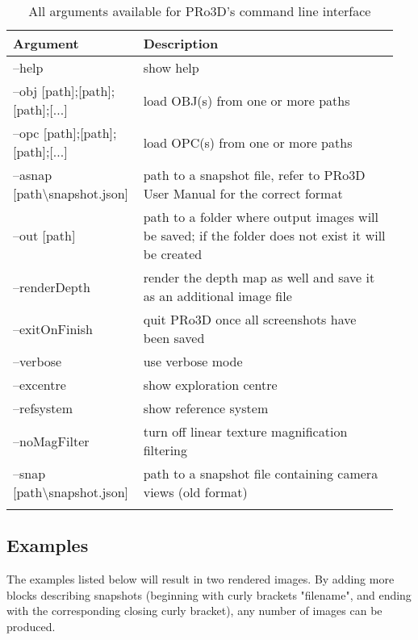  \begin{center}
 	\begin{table}
		\begin{tabular}{p{0.3\linewidth} p{0.65\linewidth} }
			\textbf{Argument}          		 & \textbf{Description} \\
			\midrule
			--help                            &  show help\\
			--obj [path];[path];[path];[...]  &  load OBJ(s) from one or more paths\\
			--opc [path];[path];[path];[...]  &  load OPC(s) from one or more paths\\
			--asnap [path\textbackslash snapshot.json]      &  path to a snapshot file, refer to PRo3D User Manual for the correct format\\
			--out [path]                      &  path to a folder where output images will be saved; if the folder does not exist it will be created\\
			--renderDepth         &              render the depth map as well and save it as an additional image file\\
			--exitOnFinish                    &  quit PRo3D once all screenshots have been saved\\
			--verbose                         &  use verbose mode\\
			--excentre                        &  show exploration centre\\
			--refsystem                       &  show reference system\\
			--noMagFilter                     &  turn off linear texture magnification filtering\\
			--snap [path\textbackslash snapshot.json]       &  path to a snapshot file containing camera views (old format)\\
			\specialrule{\lightrulewidth}{1.0pt}{4.0pt}
		\end{tabular}    
	
	\caption{All arguments available for PRo3D's command line interface} 
	
	\label{table:args} 
	\end{table}
\end{center}

\subsection{Examples} \label{cl:examples}
 The examples listed below will result in two rendered images. By adding more blocks describing snapshots (beginning with curly brackets "filename", and ending with the corresponding closing curly bracket), any number of images can be produced. 







